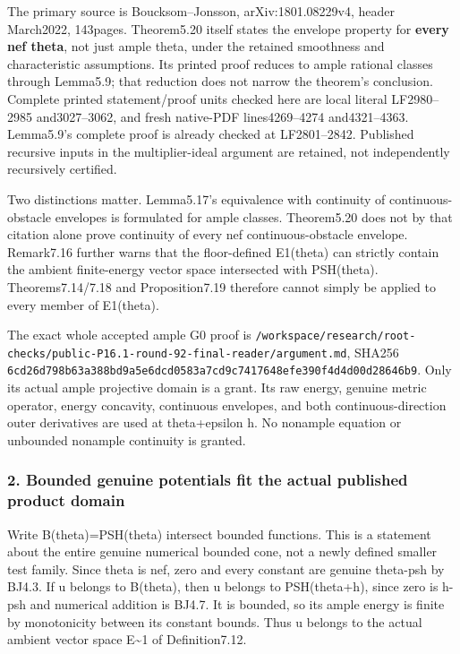 \documentclass[
  10pt,
]{article}
\begin{document}
The primary source is Boucksom--Jonsson, arXiv:1801.08229v4, header
March2022, 143pages. Theorem5.20 itself states the envelope property for
\textbf{every nef theta}, not just ample theta, under the retained
smoothness and characteristic assumptions. Its printed proof reduces to
ample rational classes through Lemma5.9; that reduction does not narrow
the theorem's conclusion. Complete printed statement/proof units checked
here are local literal LF2980--2985 and3027--3062, and fresh native-PDF
lines4269--4274 and4321--4363. Lemma5.9's complete proof is already
checked at LF2801--2842. Published recursive inputs in the
multiplier-ideal argument are retained, not independently recursively
certified.

Two distinctions matter. Lemma5.17's equivalence with continuity of
continuous-obstacle envelopes is formulated for ample classes.
Theorem5.20 does not by that citation alone prove continuity of every
nef continuous-obstacle envelope. Remark7.16 further warns that the
floor-defined E1(theta) can strictly contain the ambient finite-energy
vector space intersected with PSH(theta). Theorems7.14/7.18 and
Proposition7.19 therefore cannot simply be applied to every member of
E1(theta).

The exact whole accepted ample G0 proof is
\nolinkurl{/workspace/research/root-checks/public-P16.1-round-92-final-reader/argument.md},
SHA256
\nolinkurl{6cd26d798b63a388bd9a5e6dcd0583a7cd9c7417648efe390f4d4d00d28646b9}.
Only its actual ample projective domain is a grant. Its raw energy,
genuine metric operator, energy concavity, continuous envelopes, and
both continuous-direction outer derivatives are used at theta+epsilon h.
No nonample equation or unbounded nonample continuity is granted.

\subsubsection{2. Bounded genuine potentials fit the actual published
product
domain}\label{bounded-genuine-potentials-fit-the-actual-published-product-domain}

Write B(theta)=PSH(theta) intersect bounded functions. This is a
statement about the entire genuine numerical bounded cone, not a newly
defined smaller test family. Since theta is nef, zero and every constant
are genuine theta-psh by BJ4.3. If u belongs to B(theta), then u belongs
to PSH(theta+h), since zero is h-psh and numerical addition is BJ4.7. It
is bounded, so its ample energy is finite by monotonicity between its
constant bounds. Thus u belongs to the actual ambient vector space
E\textasciitilde1 of Definition7.12.
\end{document}

